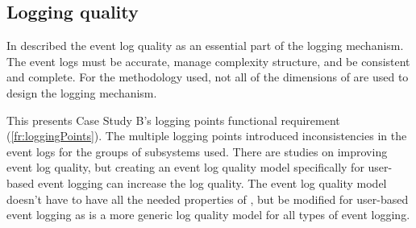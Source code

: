 \subsection{Logging quality}
In  described the event log quality as an essential part of the logging
mechanism. The event logs must be accurate, manage complexity structure, and be consistent and
complete. For the methodology used, not all of the dimensions of  are used
to design the logging mechanism.\par This presents Case Study B's logging points functional
requirement (\ref{fr:loggingPoints}). The multiple logging points introduced inconsistencies in the
event logs for the groups of subsystems used. There are studies on improving event log quality, but
creating an event log quality model specifically for user-based event logging can increase the log
quality. The event log quality model doesn't have to have all the needed properties of
, but be modified for user-based event logging as
 is a more generic log quality model for all types of event logging.

